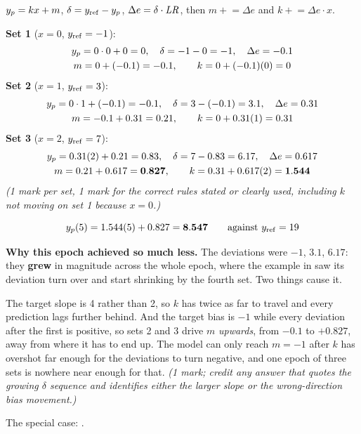 $y_{p} = kx + m$, $\delta = y_{\mathrm{ref}} - y_{p}$, $\Delta e = \delta \cdot \mathit{LR}$, then $m \mathrel{+}= \Delta e$
and $k \mathrel{+}= \Delta e \cdot x$.

\textbf{Set 1} ($x = 0$, $y_{\mathrm{ref}} = -1$):
\begin{gather*}
  y_{p} = 0 \cdot 0 + 0 = 0, \quad \delta = -1 - 0 = -1, \quad \Delta e = -0.1 \\
  m = 0 + (-0.1) = -0.1, \qquad k = 0 + (-0.1)(0) = 0
\end{gather*}
\textbf{Set 2} ($x = 1$, $y_{\mathrm{ref}} = 3$):
\begin{gather*}
  y_{p} = 0 \cdot 1 + (-0.1) = -0.1, \quad \delta = 3 - (-0.1) = 3.1, \quad \Delta e = 0.31 \\
  m = -0.1 + 0.31 = 0.21, \qquad k = 0 + 0.31(1) = 0.31
\end{gather*}
\textbf{Set 3} ($x = 2$, $y_{\mathrm{ref}} = 7$):
\begin{gather*}
  y_{p} = 0.31(2) + 0.21 = 0.83, \quad \delta = 7 - 0.83 = 6.17, \quad \Delta e = 0.617 \\
  m = 0.21 + 0.617 = \mathbf{0.827}, \qquad k = 0.31 + 0.617(2) = \mathbf{1.544}
\end{gather*}
\textit{(1 mark per set, 1 mark for the correct rules stated or clearly used, including $k$ not
moving on set 1 because $x = 0$.)}

\[
  y_{p}(5) = 1.544(5) + 0.827 = \mathbf{8.547} \qquad \text{against } y_{\mathrm{ref}} = 19
\]

\textbf{Why this epoch achieved so much less.} The deviations were $-1$, $3.1$, $6.17$: they
\textbf{grew} in magnitude across the whole epoch, where the example in  saw
its deviation turn over and start shrinking by the fourth set. Two things cause it.

The target slope is 4 rather than 2, so $k$ has twice as far to travel and every prediction lags
further behind. And the target bias is $-1$ while every deviation after the first is positive, so
sets 2 and 3 drive $m$ \emph{upwards}, from $-0.1$ to $+0.827$, away from where it has to end up.
The model can only reach $m = -1$ after $k$ has overshot far enough for the deviations to turn
negative, and one epoch of three sets is nowhere near enough for that.
\textit{(1 mark; credit any answer that quotes the growing $\delta$ sequence and identifies either
the larger slope or the wrong-direction bias movement.)}

The special case: .

